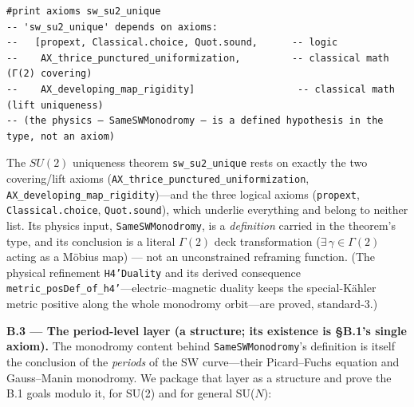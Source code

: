 \documentclass{article}
\theoremstyle{plain}
\theoremstyle{definition}
\numberwithin{equation}{section}
\newcommand{\code}[1]{\texttt{#1}}
\begin{document}
\begin{Verbatim}
#print axioms sw_su2_unique
-- 'sw_su2_unique' depends on axioms:
--   [propext, Classical.choice, Quot.sound,      -- logic
--    AX_thrice_punctured_uniformization,         -- classical math (Γ(2) covering)
--    AX_developing_map_rigidity]                  -- classical math (lift uniqueness)
-- (the physics — SameSWMonodromy — is a defined hypothesis in the type, not an axiom)
\end{Verbatim}

\noindent The $SU(2)$ uniqueness theorem \code{sw\_su2\_unique} rests on exactly the two
covering/lift axioms (\code{AX\_\allowbreak thrice\_\allowbreak punctured\_\allowbreak uniformization},
\code{AX\_developing\_map\_\allowbreak rigidity})---and the three
logical axioms (\code{propext}, \code{Classical.choice}, \code{Quot.sound}), which underlie
everything and belong to neither list. Its physics input, \code{SameSWMonodromy}, is a
\emph{definition} carried in the theorem's type, and its conclusion is a literal
$\Gamma(2)$ deck transformation ($\exists\, \gamma \in \Gamma(2)$ acting as a M\"obius map)
--- not an unconstrained reframing function. (The physical refinement \code{H4'Duality} and its
derived consequence \code{metric\_posDef\_of\_h4'}---electric--magnetic duality keeps the
special-K\"ahler metric positive along the whole monodromy orbit---are proved, standard-3.)

\medskip
\noindent\textbf{B.3 --- The period-level layer (a structure; its existence is \S B.1's single axiom).} The monodromy content behind
\code{SameSWMonodromy}'s definition is itself the conclusion of the \emph{periods} of the SW
curve---their Picard--Fuchs equation and Gauss--Manin monodromy. We package that layer as a structure and prove
the B.1 goals modulo it, for SU(2) and for general SU($N$):
\end{document}

